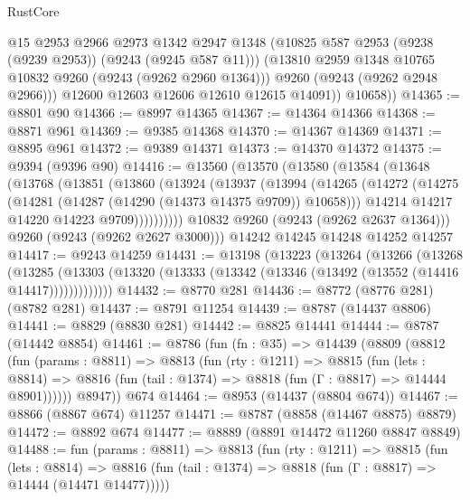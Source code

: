 \begin{lexlean}{RustCore}
\begin{coremodule}
              @15
              @2953
              @2966
              @2973
              @1342
              @2947
              @1348
              (@10825 @587 @2953 (@9238 (@9239 @2953)) (@9243 (@9245 @587 @11)))
              (@13810 @2959 @1348 @10765 @10832 @9260 (@9243 (@9262 @2960 @1364)))
              @9260
              (@9243 (@9262 @2948 @2966)))
            @12600
            @12603
            @12606
            @12610
            @12615
            @14091))
        @10658))
@14365 := @8801 @90
@14366 := @8997 @14365
@14367 := @14364 @14366
@14368 := @8871 @961
@14369 := @9385 @14368
@14370 := @14367 @14369
@14371 := @8895 @961
@14372 := @9389 @14371
@14373 := @14370 @14372
@14375 := @9394 (@9396 @90)
@14416 := @13560
    (@13570
      (@13580
        (@13584
          (@13648
            (@13768
              (@13851
                (@13860
                  (@13924
                    (@13937
                      (@13994
                        (@14265
                          (@14272
                            (@14275 (@14281 (@14287 (@14290 (@14373 @14375 @9709)) @10658)))
                            @14214
                            @14217
                            @14220
                            @14223
                            @9709))))))))))
        @10832
        @9260
        (@9243 (@9262 @2637 @1364)))
      @9260
      (@9243 (@9262 @2627 @3000)))
    @14242
    @14245
    @14248
    @14252
    @14257
@14417 := @9243 @14259
@14431 := @13198
    (@13223
      (@13264
        (@13266
          (@13268
            (@13285
              (@13303 (@13320 (@13333 (@13342 (@13346 (@13492 (@13552 (@14416 @14417)))))))))))))
@14432 := @8770 @281
@14436 := @8772 (@8776 @281) (@8782 @281)
@14437 := @8791 @11254
@14439 := @8787 (@14437 @8806)
@14441 := @8829 (@8830 @281)
@14442 := @8825 @14441
@14444 := @8787 (@14442 @8854)
@14461 := @8786
    (fun (fn : @35) =>
    @14439
      (@8809
        (@8812
          (fun (params : @8811) =>
          @8813
            (fun (rty : @1211) =>
            @8815
              (fun (lets : @8814) =>
              @8816 (fun (tail : @1374) => @8818 (fun (Γ : @8817) => @14444 @8901))))))
        @8947))
    @674
@14464 := @8953 (@14437 (@8804 @674))
@14467 := @8866 (@8867 @674) @11257
@14471 := @8787 (@8858 (@14467 @8875) @8879)
@14472 := @8892 @674
@14477 := @8889 (@8891 @14472 @11260 @8847 @8849)
@14488 := fun (params : @8811) =>
  @8813
    (fun (rty : @1211) =>
    @8815
      (fun (lets : @8814) =>
      @8816 (fun (tail : @1374) => @8818 (fun (Γ : @8817) => @14444 (@14471 @14477)))))

\end{coremodule}
\end{lexlean}

